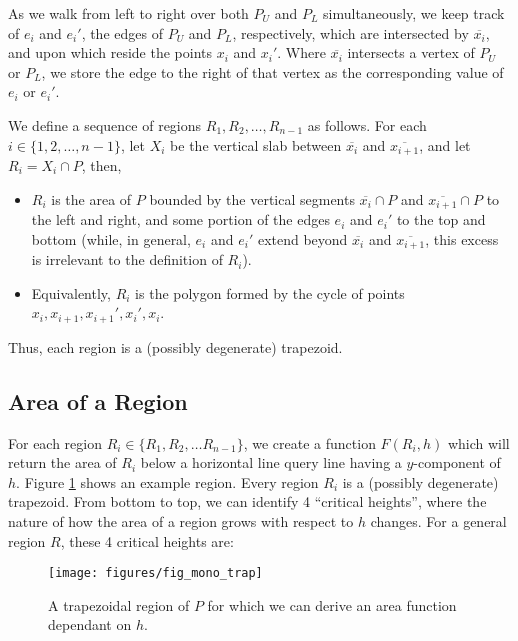 As we walk from left to right over both $P_U$ and $P_L$ simultaneously, we keep track of $e_i$ and $e_i'$, the edges of $P_U$ and $P_L$, respectively, which are intersected by $\overline{x_i}$, and upon which reside the points $x_i$ and $x_i'$. Where $\overline{x_i}$ intersects a vertex of $P_U$ or $P_L$, 
we store the edge to the right of that vertex as the corresponding value of $e_i$ or $e_i'$.

We define a sequence of regions $R_1, R_2, \dots, R_{n-1}$ as follows. For each $i \in \{1, 2, \ldots, n-1\}$, let $X_i$ be the vertical slab between $\overline{x_i}$ and $\overline{x_{i+1}}$, and let $R_i = X_i \cap P$, then,

\begin{itemize}
 \item $R_i$ is the area of $P$ bounded by the vertical segments $\overline{x_i} \cap P$ and $\overline{x_{i+1}} \cap P$ to the left and right, and some portion of the edges $e_i$ and $e_i'$ to the top and bottom (while, in general, $e_i$ and  $e_i'$ extend beyond $\overline{x_i}$ and $\overline{x_{i+1}}$, this excess is irrelevant to the definition of $R_i$).
 
 \item Equivalently, $R_i$ is the polygon formed by the cycle of points $x_i, x_{i+1}, x_{i+1}', x_i', x_i$.
\end{itemize}

\noindent
Thus, each region is a (possibly degenerate) trapezoid.


\subsection{Area of a Region}
\label{sec:region_area}

For each region $R_i \in \{R_1, R_2, \ldots R_{n-1}\}$, we create a function $F(R_i, h)$ which will return the area of $R_i$ below a horizontal line query line having a $y$-component of $h$. Figure \ref{fig:monotonep:trapezoid} shows an example region. Every region $R_i$ is a (possibly degenerate) trapezoid. From bottom to top, we can identify 4 ``critical heights'', where the nature of how the area of a region grows with respect to $h$ changes.  For a general region $R$, these 4 critical heights are:

\begin{figure}[t]
\begin{center}
  \texttt{[image: figures/fig\_mono\_trap]}
  \caption[A trapezoidal region of $P$.]{A trapezoidal region of $P$ for which we can derive an area function dependant on $h$.}
  \label{fig:monotonep:trapezoid}
\end{center}
\end{figure}

